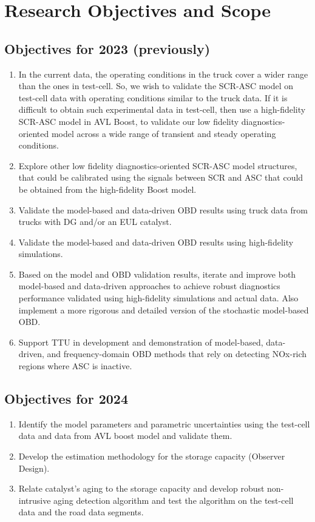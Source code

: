 \section{Research Objectives and Scope}
\subsection{Objectives for 2023 (previously)}
\begin{enumerate}
 \item In the current data, the operating conditions in the truck cover a wider range than the ones in test-cell. So, we wish to validate the SCR-ASC model on test-cell data with operating conditions similar to the truck data. If it is difficult to obtain such experimental data in test-cell, then use a high-fidelity SCR-ASC model in AVL Boost, to validate our low fidelity diagnostics-oriented model across a wide range of transient and steady operating conditions.
 \item Explore other low fidelity diagnostics-oriented SCR-ASC model structures, that could be calibrated using the signals between SCR and ASC that could be obtained from the high-fidelity Boost model.
 \item Validate the model-based and data-driven OBD results using truck data from trucks with DG and/or an EUL catalyst.
 \item Validate the model-based and data-driven OBD results using high-fidelity simulations.
 \item Based on the model and OBD validation results, iterate and improve both model-based and data-driven approaches to achieve robust diagnostics performance validated using high-fidelity simulations and actual data. Also implement a more rigorous and detailed version of the stochastic model-based OBD.
 \item Support TTU in development and demonstration of model-based, data-driven, and frequency-domain OBD methods that rely on detecting NOx-rich regions where ASC is inactive.
\end{enumerate}


\subsection{Objectives for 2024}
\begin{enumerate}
\item Identify the model parameters and parametric uncertainties using
the test-cell data and data from AVL boost model and validate them.
\item Develop the estimation methodology for the storage capacity (Observer Design).
\item Relate catalyst's aging to the storage capacity and develop robust
non-intrusive aging detection algorithm and test the algorithm on the test-cell
data and the road data segments.
\end{enumerate}
